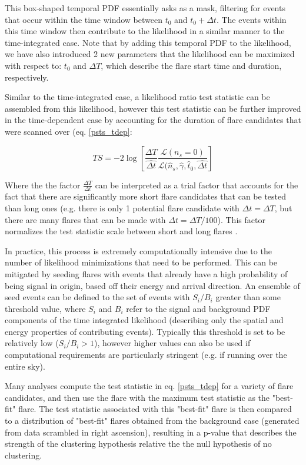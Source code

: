 This box-shaped temporal PDF essentially asks as a mask, filtering for events that occur within the time window between $t_0$ and $t_0 + \Delta t$. The events within this time window then contribute to the likelihood in a similar manner to the time-integrated case. Note that by adding this temporal PDF to the likelihood, we have also introduced 2 new parameters that the likelihood can be maximized with respect to: $t_0$ and $\Delta T$, which describe the flare start time and duration, respectively. 

Similar to the time-integrated case, a likelihood ratio test statistic can be assembled from this likelihood, however this test statistic can be further improved in the time-dependent case by accounting for the duration of flare candidates that were scanned over (eq. \ref{psts_tdep}:

\begin{equation}
    TS = -2 \log [\frac{\Delta T}{\hat{\Delta t}}\frac{\mathcal{L}(n_s=0)}{\mathcal{L}(\hat{n}_s, \hat{\gamma}, \hat{t}_0, \hat{\Delta t}}]
    \label{psts_tdep}
\end{equation}

Where the the factor $\frac{\Delta T}{\Delta t}$ can be interpreted as a trial factor that accounts for the fact that there are significantly more short flare candidates that can be tested than long ones (e.g. there is only 1 potential flare candidate with $\Delta t = \Delta T$, but there are many flares that can be made with $\Delta t = \Delta T/100$). This factor normalizes the test statistic scale between short and long flares \cite{Braun_2010}.

In practice, this process is extremely computationally intensive due to the number of likelihood minimizations that need to be performed. This can be mitigated by seeding flares with events that already have a high probability of being signal in origin, based off their energy and arrival direction. An ensemble of seed events can be defined to the set of events with $S_i/B_i$ greater than some threshold value, where $S_i$ and $B_i$ refer to the signal and background PDF components of the time integrated likelihood (describing only the spatial and energy properties of contributing events). Typically this threshold is set to be relatively low ($S_i/B_i > 1$), however higher values can also be used if computational requirements are particularly stringent (e.g. if running over the entire sky). 

Many analyses compute the test statistic in eq. \ref{psts_tdep} for a variety of flare candidates, and then use the flare with the maximum test statistic as the "best-fit" flare. The test statistic associated with this "best-fit" flare is then compared to a distribution of "best-fit" flares obtained from the background case (generated from data scrambled in right ascension), resulting in a p-value that describes the strength of the clustering hypothesis relative the the null hypothesis of no clustering. 

